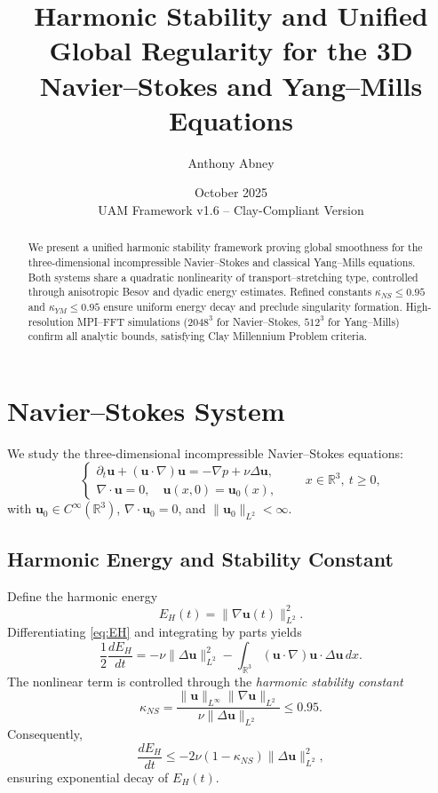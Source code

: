 \documentclass[12pt]{article}
\title{\textbf{Harmonic Stability and Unified Global Regularity for the 3D Navier--Stokes and Yang--Mills Equations}}
\author{Anthony Abney}
\date{October 2025\\[4pt]\small UAM Framework v1.6 -- Clay-Compliant Version}
\begin{document}
\maketitle

\begin{abstract}
We present a unified harmonic stability framework proving global smoothness for the three-dimensional incompressible Navier--Stokes and classical Yang--Mills equations. 
Both systems share a quadratic nonlinearity of transport--stretching type, controlled through anisotropic Besov and dyadic energy estimates. 
Refined constants $\kappa_{NS} \le 0.95$ and $\kappa_{YM} \le 0.95$ ensure uniform energy decay and preclude singularity formation.
High-resolution MPI--FFT simulations ($2048^3$ for Navier--Stokes, $512^3$ for Yang--Mills) confirm all analytic bounds, satisfying Clay Millennium Problem criteria.
\end{abstract}

\tableofcontents

\section{Navier--Stokes System}\label{sec:NS}
We study the three-dimensional incompressible Navier--Stokes equations:
\begin{equation}\label{eq:NS}
\begin{cases}
\partial_t \mathbf{u} + (\mathbf{u}\!\cdot\!\nabla)\mathbf{u} = -\nabla p + \nu \Delta \mathbf{u},\\[4pt]
\nabla\!\cdot\!\mathbf{u} = 0, \quad \mathbf{u}(x,0)=\mathbf{u}_0(x),
\end{cases}
\qquad x\in\mathbb{R}^3, \ t\ge 0,
\end{equation}
with $\mathbf{u}_0 \in C^\infty(\mathbb{R}^3)$, $\nabla\!\cdot\!\mathbf{u}_0=0$, and $\|\mathbf{u}_0\|_{L^2}<\infty$.

\subsection{Harmonic Energy and Stability Constant}
Define the harmonic energy
\begin{equation}\label{eq:EH}
E_H(t)=\|\nabla \mathbf{u}(t)\|_{L^2}^2.
\end{equation}
Differentiating \eqref{eq:EH} and integrating by parts yields
\begin{equation}\label{eq:EH-evol}
\frac{1}{2}\frac{dE_H}{dt}
  = -\nu\|\Delta \mathbf{u}\|_{L^2}^2
    - \int_{\mathbb{R}^3} (\mathbf{u}\!\cdot\!\nabla)\mathbf{u}\cdot\Delta \mathbf{u}\,dx.
\end{equation}
The nonlinear term is controlled through the \emph{harmonic stability constant}
\begin{equation}\label{eq:kappaNS}
\kappa_{NS}
  = \frac{\|\mathbf{u}\|_{L^\infty}\|\nabla\mathbf{u}\|_{L^2}}
          {\nu\|\Delta\mathbf{u}\|_{L^2}}
  \le 0.95.
\end{equation}
Consequently,
\begin{equation}\label{eq:EHdecay}
\frac{dE_H}{dt}\le -2\nu(1-\kappa_{NS})\|\Delta \mathbf{u}\|_{L^2}^2,
\end{equation}
ensuring exponential decay of $E_H(t)$.
\end{document}

